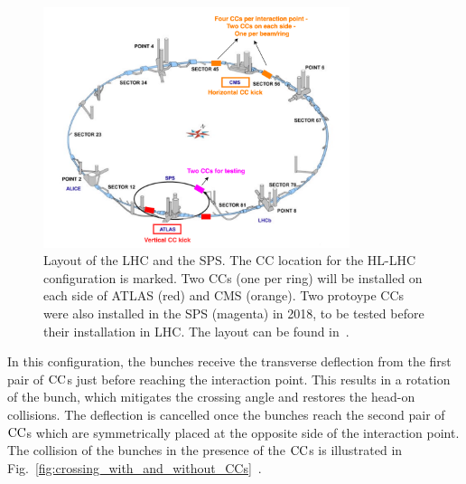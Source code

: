 \begin{figure}[!h] %
    \centering         
    \includegraphics[width=0.8\textwidth]{images/introduction/LHC_layout_CCs.png}
        \caption{Layout of the LHC and the SPS. The CC location for the HL-LHC configuration is marked. Two CCs (one per ring) will be installed on each side of ATLAS (red) and CMS (orange). Two protoype CCs were also installed in the SPS (magenta) in 2018, to be tested before their installation in LHC. The layout can be found in~\cite{LHC_SPS_layout}.}%
        \label{fig:LHC_layout_CCs}
 \end{figure}

In this configuration, the bunches receive the transverse deflection from the first pair of ${\mathrm{CC}}$s just before reaching the interaction point. This results in a rotation of the bunch, which mitigates the crossing angle and restores the head-on collisions. The deflection is cancelled once the bunches reach the second pair of ${\mathrm{CC}}$s which are symmetrically placed at the opposite side of the interaction point. The collision of the bunches in the presence of the ${\mathrm{CC}}$s is illustrated in Fig.~\ref{fig:crossing_with_and_without_CCs}~\cite{Verdú-Andrés:2263119}.

